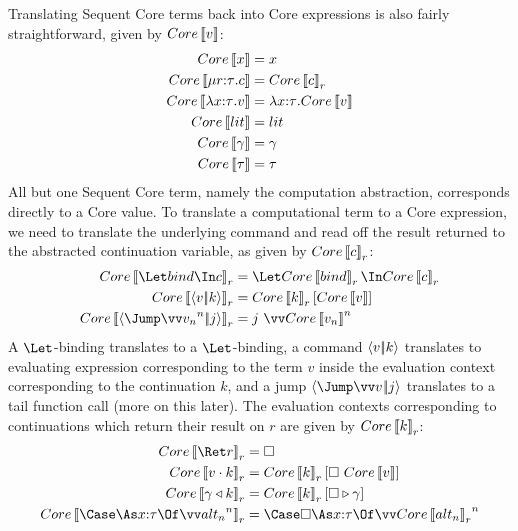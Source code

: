 \documentclass{article}
\begin{document}
Translating Sequent Core terms back into Core expressions is also fairly
straightforward, given by $Core\left\llbracket{v}\right\rrbracket$:
\begin{align*}
  Core\left\llbracket{x}\right\rrbracket &= x
  \\
  Core\left\llbracket{\mu{r{:}{\tau}}. c}\right\rrbracket &= Core\left\llbracket{c}\right\rrbracket_{r}
  \\
  Core\left\llbracket{\lambda{x{:}{\tau}}.v}\right\rrbracket &= \lambda{x{:}{\tau}}.Core\left\llbracket{v}\right\rrbracket
  \\
  Core\left\llbracket{lit}\right\rrbracket &= lit
  \\
  Core\left\llbracket{\gamma}\right\rrbracket &= \gamma
  \\
  Core\left\llbracket{\tau}\right\rrbracket &= \tau
\end{align*}
All but one Sequent Core term, namely the computation abstraction, corresponds
directly to a Core value.  To translate a computational term to a Core
expression, we need to translate the underlying command and read off the result
returned to the abstracted continuation variable, as given by
$Core\left\llbracket{c}\right\rrbracket_{r}$:
\begin{align*}
  Core\trans{\Let \abind \In \cmd}_{r}
  &=
  \Let Core\trans{\abind}_{r} \In Core\trans{\cmd}_{r}
  \\
  Core\trans{\cut{\tm}{\ko}}_{r}
  &=
  Core\trans{\ko}_{r}[Core\trans{\tm}]
  \\
  Core\trans{\jump{\vect[n]{\tm_n}}{j}}_{r}
  &=
  j ~ \vect[n]{Core\trans{\tm_n}}
\end{align*}
A $\Let$-binding translates to a $\Let$-binding, a command $\left\langle{v}\middle|\!\middle|{k}\right\rangle$
translates to evaluating expression corresponding to the term $v$ inside the
evaluation context corresponding to the continuation $k$, and a jump
$\jump{\vect{v}}{j}$ translates to a tail function call (more on this later).
The evaluation contexts corresponding to continuations which return their result
on $r$ are given by $Core\left\llbracket{k}\right\rrbracket_{r}$:
\begin{align*}
  Core\trans{\ret r}_{r} &= \hole
  \\
  Core\trans{\app{\tm}{\ko}}_{r}
  &=
  Core\trans{\ko}_{r}[\hole ~ Core\trans{\tm}]
  \\
  Core\trans{\koerce{\cn}{\ko}}_{r}
  &=
  Core\trans{\ko}_{r}[\coerce{\hole}{\cn}]
  \\
  Core\trans{\caseas{\ann x \ty}{\vect[n]{\analt_n}}}_{r}
  &=
  \Case \hole \As \ann x \ty \Of \vect[n]{Core\trans{\analt_n}_{r}}
\end{align*}
\end{document}
